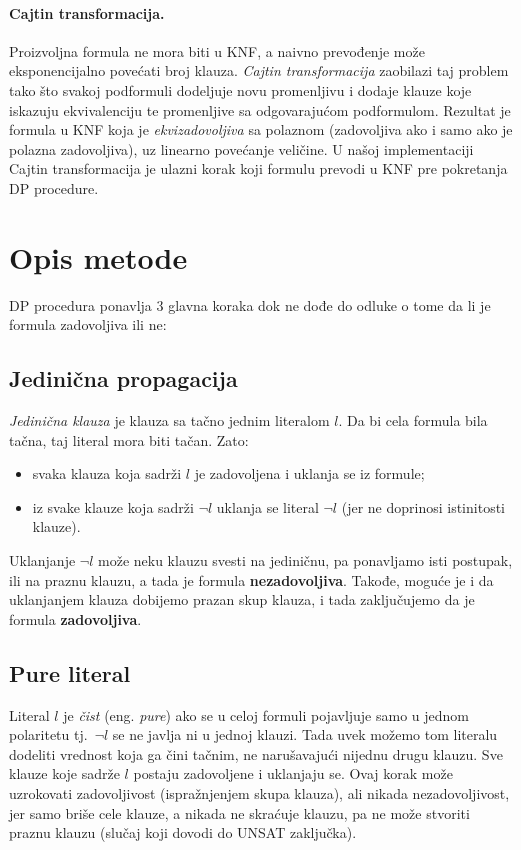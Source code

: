 \documentclass[a4paper,10pt]{article}
\begin{document}
\paragraph{Cajtin transformacija.} Proizvoljna formula ne mora biti u KNF, a naivno prevođenje može eksponencijalno povećati broj klauza. \emph{Cajtin transformacija} zaobilazi taj problem tako što svakoj podformuli dodeljuje novu promenljivu i dodaje klauze koje iskazuju ekvivalenciju te promenljive sa odgovarajućom podformulom. Rezultat je formula u KNF koja je \emph{ekvizadovoljiva} sa polaznom (zadovoljiva ako i samo ako je polazna zadovoljiva), uz linearno povećanje veličine. U našoj implementaciji Cajtin transformacija je ulazni korak koji formulu prevodi u KNF pre pokretanja DP procedure.



\section{Opis metode}
\label{sec:opis_metode}

DP procedura ponavlja 3 glavna koraka dok ne dođe do odluke o tome da li je formula zadovoljiva ili ne:
\subsection{Jedinična propagacija}
\emph{Jedinična klauza} je klauza sa tačno jednim literalom $l$. Da bi cela formula bila tačna, taj literal mora biti tačan. Zato:
\begin{itemize}
  \item svaka klauza koja sadrži $l$ je zadovoljena i uklanja se iz formule;
  \item iz svake klauze koja sadrži $\neg l$ uklanja se literal $\neg l$ (jer ne doprinosi istinitosti klauze).
\end{itemize}

Uklanjanje $\neg l$ može neku klauzu svesti na jediničnu, pa ponavljamo isti postupak, ili na praznu klauzu, a tada je formula \textbf{nezadovoljiva}.
Takođe, moguće je i da uklanjanjem klauza dobijemo prazan skup klauza, i tada zaključujemo da je formula \textbf{zadovoljiva}.

\subsection{Pure literal}
Literal $l$ je \emph{čist} (eng. \emph{pure}) ako se u celoj formuli pojavljuje samo u jednom polaritetu tj.\ $\neg l$ se ne javlja ni u jednoj klauzi. Tada uvek možemo tom literalu dodeliti vrednost koja ga čini tačnim, ne narušavajući nijednu drugu klauzu. Sve klauze koje sadrže $l$ postaju zadovoljene i uklanjaju se. Ovaj korak može uzrokovati zadovoljivost (ispražnjenjem skupa klauza), ali nikada nezadovoljivost, jer samo briše cele klauze, a nikada ne skraćuje klauzu, pa ne može stvoriti praznu klauzu (slučaj koji dovodi do UNSAT zaključka).
\end{document}
